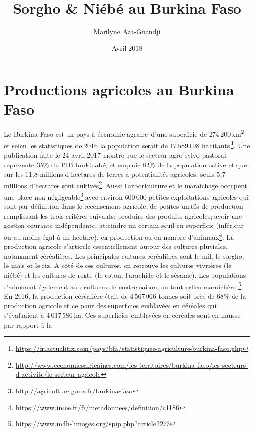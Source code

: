 \documentclass[a4paper,11pt]{article}
\begin{document}
\title{Sorgho \& Niébé au Burkina Faso}
\author{Marilyne Aza-Gnandji}
\date{Avril 2018} 

\maketitle
\tableofcontents

\section{Productions agricoles au Burkina Faso}

Le Burkina Faso est un pays à économie
agraire\,\cite{Koulibi_FideleZONGO} d'une superficie de
274\,200\,km\textsuperscript{2}\,et selon les statistiques de 2016 la
population serait de 17\,589\,198
habitants\,\footnote{\url{https://fr.actualitix.com/pays/bfa/statistiques-agriculture-burkina-faso.php}}. Une
publication faite le 24 avril 2017 montre que le secteur
agro-sylvo-pastoral représente 35\% du PIB burkinabé, et emploie 82\%
de la population active et que sur les 11,8 millions d'hectares de
terres à potentialités agricoles, seuls 5,7 millions d'hectares sont
cultivés\footnote{\url{http://www.economiesafricaines.com/les-territoires/burkina-faso/les-secteurs-d-activite/le-secteur-agricole}}. Aussi
l'arboriculture et le maraîchage occupent une place non
négligeable\footnote{\url{http://agriculture.gouv.fr/burkina-faso}}
avec environ 600\,000 petites exploitations agricoles qui sont par
définition dans le recensement agricole, de petites unités de
production remplissant les trois critères suivants: produire des
produits agricoles; avoir une gestion courante indépendante; atteindre
un certain seuil en superficie (inférieur ou au moins égal à un
hectare), en production ou en nombre
d'animaux\footnote{https://www.insee.fr/fr/metadonnees/definition/c1186}. La
production agricole s'articule essentiellement autour des cultures
pluviales, notamment céréalières. Les principales cultures céréalières
sont le mil, le sorgho, le maïs et le riz. A côté de ces cultures, on
retrouve les cultures vivrières (le niébé) et les cultures de rente
(le coton, l'arachide et le sésame). Les populations s'adonnent
également aux cultures de contre saison, surtout celles
maraîchères\footnote{\url{https://www.mdh-limoges.org/spip.php?article2273}}.
En 2016, la production céréalière était de 4\,567\,066 tonnes soit
près de 68\% de la production agricole et ce pour des superficies
emblavées en céréales qui s'évaluaient à 4\,017\,586\,ha. Ces
superficies emblavées en céréales sont en hausse par rapport à la
\end{document}

